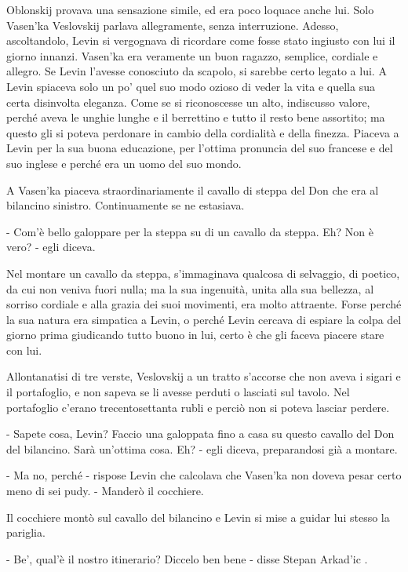 Oblonskij provava una sensazione simile, ed era poco loquace anche lui. Solo Vasen'ka Veslovskij parlava allegramente, senza interruzione. Adesso, ascoltandolo, Levin si vergognava di ricordare come fosse stato ingiusto con lui il giorno innanzi. Vasen'ka era veramente un buon ragazzo, semplice, cordiale e allegro. Se Levin l'avesse conosciuto da scapolo, si sarebbe certo legato a lui. A Levin spiaceva solo un po' quel suo modo ozioso di veder la vita e quella sua certa disinvolta eleganza. Come se si riconoscesse un alto, indiscusso valore, perché aveva le unghie lunghe e il berrettino e tutto il resto bene assortito; ma questo gli si poteva perdonare in cambio della cordialità e della finezza. Piaceva a Levin per la sua buona educazione, per l'ottima pronuncia del suo francese e del suo inglese e perché era un uomo del suo mondo. 

A Vasen'ka piaceva straordinariamente il cavallo di steppa del Don che era al bilancino sinistro. Continuamente se ne estasiava. 

- Com'è bello galoppare per la steppa su di un cavallo da steppa. Eh? Non è vero? - egli diceva. 

Nel montare un cavallo da steppa, s'immaginava qualcosa di selvaggio, di poetico, da cui non veniva fuori nulla; ma la sua ingenuità, unita alla sua bellezza, al sorriso cordiale e alla grazia dei suoi movimenti, era molto attraente. Forse perché la sua natura era simpatica a Levin, o perché Levin cercava di espiare la colpa del giorno prima giudicando tutto buono in lui, certo è che gli faceva piacere stare con lui. 

Allontanatisi di tre verste, Veslovskij a un tratto s'accorse che non aveva i sigari e il portafoglio, e non sapeva se li avesse perduti o lasciati sul tavolo. Nel portafoglio c'erano trecentosettanta rubli e perciò non si poteva lasciar perdere. 

- Sapete cosa, Levin? Faccio una galoppata fino a casa su questo cavallo del Don del bilancino. Sarà un'ottima cosa. Eh? - egli diceva, preparandosi già a montare. 

- Ma no, perché - rispose Levin che calcolava che Vasen'ka non doveva pesar certo meno di sei pudy. - Manderò il cocchiere. 

Il cocchiere montò sul cavallo del bilancino e Levin si mise a guidar lui stesso la pariglia. 

\label{ix-5} 

- Be', qual'è il nostro itinerario? Diccelo ben bene - disse Stepan Arkad'ic . 

